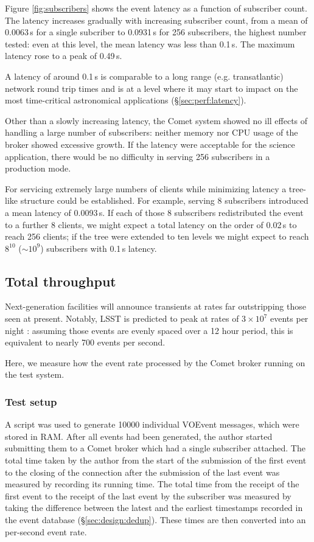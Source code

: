\documentclass[5p,authoryear]{elsarticle}
\begin{document}
Figure \ref{fig:subscribers} shows the event latency as a function of
subscriber count. The latency increases gradually with increasing subscriber
count, from a mean of 0.0063\,s for a single subcriber to 0.0931\,s for 256
subscribers, the highest number tested: even at this level, the mean latency
was less than 0.1\,s. The maximum latency rose to a peak of 0.49\,s.

A latency of around 0.1\,s is comparable to a long range (e.g. transatlantic)
network round trip times and is at a level where it may start to impact on the
most time-critical astronomical applications (\S\ref{sec:perf:latency}).

Other than a slowly increasing latency, the Comet system showed no
ill effects of handling a large number of subscribers: neither memory nor CPU
usage of the broker showed excessive growth. If the latency were acceptable
for the science application, there would be no difficulty in serving 256
subscribers in a production mode.

For servicing extremely large numbers of clients while minimizing latency a
tree-like structure could be established. For example, serving 8 subscribers
introduced a mean latency of 0.0093\,s. If each of those 8 subscribers
redistributed the event to a further 8 clients, we might expect a total
latency on the order of 0.02\,s to reach 256 clients; if the tree were
extended to ten levels we might expect to reach $8^{10}$ ($\sim 10^9$)
subscribers with 0.1\,s latency.

\subsection{Total throughput}
\label{sec:perf:total}

Next-generation facilities will announce transients at rates far outstripping
those seen at present. Notably, LSST is predicted to peak at rates of
$3\times10^7$ events per night \citep{Kantor:2014}: assuming those events are
evenly spaced over a 12 hour period, this is equivalent to nearly 700 events
per second.

Here, we measure how the event rate processed by the Comet broker running on
the test system.

\subsubsection{Test setup}
\label{sec:perf:total:setup}

A script was used to generate 10000 individual VOEvent messages, which were
stored in RAM. After all events had been generated, the author started
submitting them to a Comet broker which had a single subscriber attached. The
total time taken by the author from the start of the submission of the first
event to the closing of the connection after the submission of the last event
was measured by recording its running time. The total time from the receipt of
the first event to the receipt of the last event by the subscriber was
measured by taking the difference between the latest and the earliest
timestamps recorded in the event database (\S\ref{sec:design:dedup}). These
times are then converted into an per-second event rate.
\end{document}

